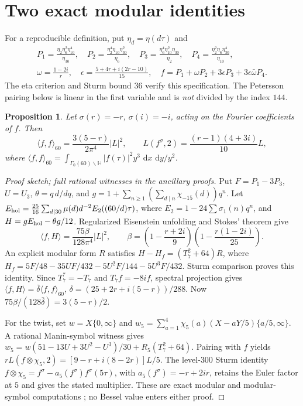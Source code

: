\documentclass[11pt]{article}
\numberwithin{equation}{section}
\newtheorem{proposition}[theorem]{Proposition}
\theoremstyle{definition}
\theoremstyle{remark}
\newcommand{\dd}{\,\mathrm d}
\theoremstyle{plain}
\begin{document}
\section{Two exact modular identities}
For a reproducible definition, put $\eta_d=\eta(d\tau)$ and
\begin{equation}\label{eq:eta}
\begin{gathered}
 P_1=\frac{\eta_2\eta_6^2\eta_{10}^4}{\eta_{30}},\quad
 P_2=\frac{\eta_2^4\eta_{10}\eta_{30}^2}{\eta_6},\quad
 P_3=\frac{\eta_6^4\eta_{10}^2\eta_{30}}{\eta_2},\quad
 P_4=\frac{\eta_2^2\eta_6\eta_{30}^4}{\eta_{10}},\\
 \omega=\frac{1-2i}{r},\quad
 \epsilon=\frac{5+4r+i(2r-10)}{15},\quad
 f=P_1+\omega P_2+3\epsilon P_3+3\epsilon\bar\omega P_4.
\end{gathered}
\end{equation}
The eta criterion and Sturm bound $36$ verify this specification.
The Petersson pairing below is linear in the first variable and is
\emph{not} divided by the index $144$.
\begin{proposition}\label{prop:modular}
Let $\sigma(r)=-r$, $\sigma(i)=-i$, acting on the Fourier coefficients of $f$.
Then
\begin{equation}\label{eq:normtwist}
 \boxed{\langle f,f\rangle_{60}
 =\frac{3(5-r)}{2\pi^4}|L|^2,\qquad
 L(f^\sigma,2)=\frac{(r-1)(4+3i)}{10}L,}
\end{equation}
where $\langle f,f\rangle_{60}
=\int_{\Gamma_0(60)\backslash\mathbb H}|f(\tau)|^2y^3\,\dd x\,\dd y/y^2$.
\end{proposition}
\begin{proof}[Proof sketch; full rational witnesses in the ancillary proofs]
Put $F=P_1-3P_3$, $U=U_3$, $\theta=q\,d/dq$, and
$g=1+\sum_{n\ge1}(\sum_{d\mid n}\chi_{-15}(d))q^n$.
Let $E_{\rm hol}=\frac{25}{16}\sum_{d\mid30}\mu(d)d^{-2}E_2((60/d)\tau)$,
where $E_2=1-24\sum\sigma_1(n)q^n$, and $H=gE_{\rm hol}-\theta g/12$.
Regularized Eisenstein unfolding and Stokes' theorem give
\[
 \langle f,H\rangle=\frac{75\beta}{128\pi^4}|L|^2,\qquad
 \beta=\left(1-\frac{r+2i}{9}\right)
       \left(1-\frac{r(1-2i)}{25}\right).
\]
An explicit modular form $R$ satisfies
$H-H_f=(T_7^2+64)R$, where
$H_f=5F/48-35UF/432-5U^2F/144-5U^3F/432$.
Sturm comparison proves this identity.
Since $T_7^*=-T_7$ and $T_7f=-8if$, spectral projection gives
$\langle f,H\rangle=\bar\delta\langle f,f\rangle_{60}$,
$\delta=(25+2r+i(5-r))/288$.
Now $75\beta/(128\bar\delta)=3(5-r)/2$.

For the twist, set $w=X\{0,\infty\}$ and
$w_5=\sum_{a=1}^4\chi_5(a)(X-aY/5)\{a/5,\infty\}$.
A rational Manin-symbol witness gives
$w_5=w(51-13U+3U^2-U^3)/30+R_5(T_7^2+64)$.
Pairing with $f$ yields
$rL(f\otimes\chi_5,2)=[9-r+i(8-2r)]L/5$.
The level-$300$ Sturm identity
$f\otimes\chi_5=f^\sigma-a_5(f^\sigma)f^\sigma(5\tau)$,
with $a_5(f^\sigma)=-r+2ir$, retains the Euler factor at $5$
and gives the stated multiplier. These are exact modular and modular-symbol
computations \cite{Stein}; no Bessel value enters either proof.
\end{proof}
\end{document}
